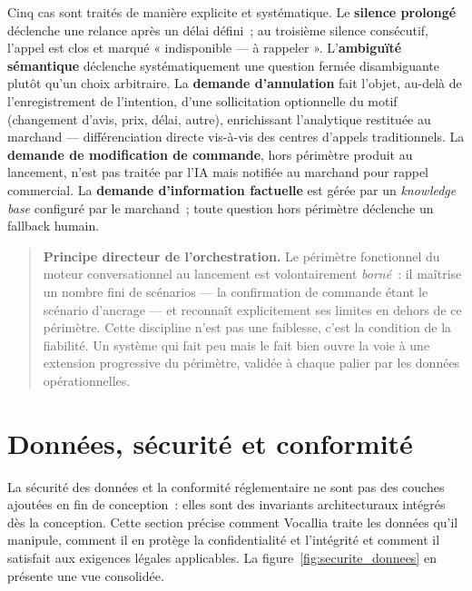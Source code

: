 Cinq cas sont traités de manière explicite et systématique. Le \textbf{silence prolongé} déclenche une relance après un délai défini~; au troisième silence consécutif, l'appel est clos et marqué « indisponible — à rappeler ». L'\textbf{ambiguïté sémantique} déclenche systématiquement une question fermée disambiguante plutôt qu'un choix arbitraire. La \textbf{demande d'annulation} fait l'objet, au-delà de l'enregistrement de l'intention, d'une sollicitation optionnelle du motif (changement d'avis, prix, délai, autre), enrichissant l'analytique restituée au marchand — différenciation directe vis-à-vis des centres d'appels traditionnels. La \textbf{demande de modification de commande}, hors périmètre produit au lancement, n'est pas traitée par l'IA mais notifiée au marchand pour rappel commercial. La \textbf{demande d'information factuelle} est gérée par un \emph{knowledge base} configuré par le marchand~; toute question hors périmètre déclenche un fallback humain.

\begin{quote}
\textbf{Principe directeur de l'orchestration.} Le périmètre fonctionnel du moteur conversationnel au lancement est volontairement \emph{borné}~: il maîtrise un nombre fini de scénarios — la confirmation de commande étant le scénario d'ancrage — et reconnaît explicitement ses limites en dehors de ce périmètre. Cette discipline n'est pas une faiblesse, c'est la condition de la fiabilité. Un système qui fait peu mais le fait bien ouvre la voie à une extension progressive du périmètre, validée à chaque palier par les données opérationnelles.
\end{quote}

\section{Données, sécurité et conformité}
\label{sec:donnees_securite}

La sécurité des données et la conformité réglementaire ne sont pas des couches ajoutées en fin de conception~: elles sont des invariants architecturaux intégrés dès la conception. Cette section précise comment Vocallia traite les données qu'il manipule, comment il en protège la confidentialité et l'intégrité et comment il satisfait aux exigences légales applicables. La figure~\ref{fig:securite_donnees} en présente une vue consolidée.

